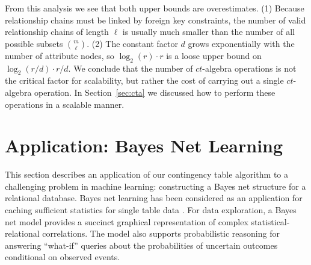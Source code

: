 \documentclass{vldb}
\newcommand{\ct}{\mathit{ct}}
\begin{document}
From this analysis we see that both upper bounds are overestimates. (1) Because relationship chains must be linked by foreign key constraints, the number of valid relationship chains of length $\ell$ is usually much smaller than the number of all possible subsets ${m\choose \ell}$. (2) The constant factor $d$ grows exponentially with the number of attribute nodes, so $\log_{2}(r) \cdot r$ is a loose upper bound on $\log_{2} (r/d) \cdot r/d$. 
We conclude that the number of $\ct$-algebra operations is not the critical factor for scalability, but rather the cost of %
carrying out a single $\ct$-algebra operation. 
In Section~\ref{sec:cta} we discussed how to perform these operations in a scalable manner.
%
%


\section{Application: Bayes Net  Learning }

This section describes an application of our contingency table algorithm to a challenging problem in machine learning: constructing a Bayes net structure for a relational database. Bayes net learning has been considered as an application for caching sufficient statistics for single table data \cite{Moore1998,lv2012}.
 For data exploration, a Bayes net  model provides a succinct graphical representation of complex statistical-relational correlations. The model also supports probabilistic reasoning for answering ``what-if'' queries about the probabilities of uncertain outcomes conditional on observed events. 
\end{document}
